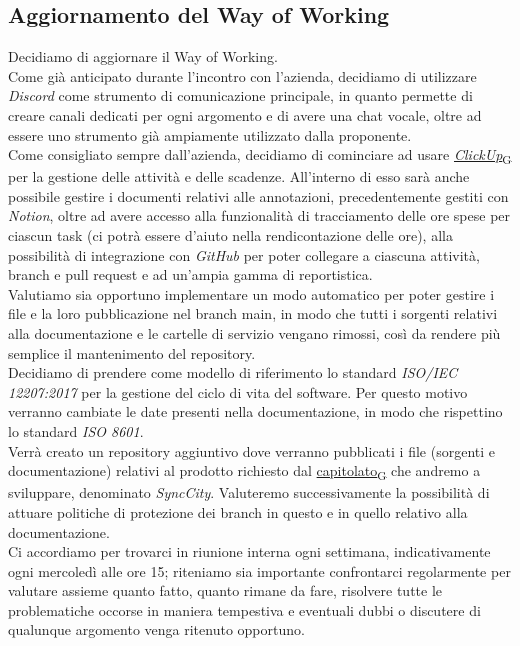 \documentclass[italian,12pt]{article}
\begin{document}
\subsection{Aggiornamento del Way of Working}
Decidiamo di aggiornare il Way of Working. \\
Come già anticipato durante l'incontro con l'azienda, decidiamo di utilizzare \textit{Discord} come strumento di comunicazione principale, in quanto permette di creare canali dedicati per ogni argomento e di avere una chat vocale, oltre ad essere uno strumento già ampiamente utilizzato dalla proponente. \\
Come consigliato sempre dall'azienda, decidiamo di cominciare ad usare \href{https://7last.github.io/docs/rtb/documentazione-interna/glossario#clickup}{\textit{ClickUp}\textsubscript{G}} per la gestione delle attività e delle scadenze. All'interno di esso sarà anche possibile gestire i documenti relativi alle annotazioni, precedentemente gestiti con \textit{Notion}, oltre ad avere accesso alla funzionalità di tracciamento delle ore spese per ciascun task (ci potrà essere d'aiuto nella rendicontazione delle ore), alla possibilità di integrazione con \textit{GitHub} per poter collegare a ciascuna attività, branch e pull request e ad un'ampia gamma di reportistica. \\
Valutiamo sia opportuno implementare un modo automatico per poter gestire i file e la loro pubblicazione nel branch main, in modo che tutti i sorgenti relativi alla documentazione e le cartelle di servizio vengano rimossi, così da rendere più semplice il mantenimento del repository. \\
Decidiamo di prendere come modello di riferimento lo standard \textit{ISO/IEC 12207:2017} per la gestione del ciclo di vita del software. Per questo motivo verranno cambiate le date presenti nella documentazione, in modo che rispettino lo standard \textit{ISO 8601}. \\
Verrà creato un repository aggiuntivo dove verranno pubblicati i file (sorgenti e documentazione) relativi al prodotto 
richiesto dal \href{https://7last.github.io/docs/rtb/documentazione-interna/glossario#capitolato}{capitolato\textsubscript{G}} che andremo a sviluppare, denominato \textit{SyncCity}. Valuteremo successivamente 
la possibilità di attuare politiche di protezione dei branch in questo e in quello relativo alla documentazione. \\
Ci accordiamo per trovarci in riunione interna ogni settimana, indicativamente ogni mercoledì alle ore 15; riteniamo sia importante confrontarci regolarmente per valutare assieme quanto fatto, quanto rimane da fare, risolvere tutte le problematiche occorse in maniera tempestiva e eventuali dubbi o discutere di qualunque argomento venga ritenuto opportuno.
\end{document}
